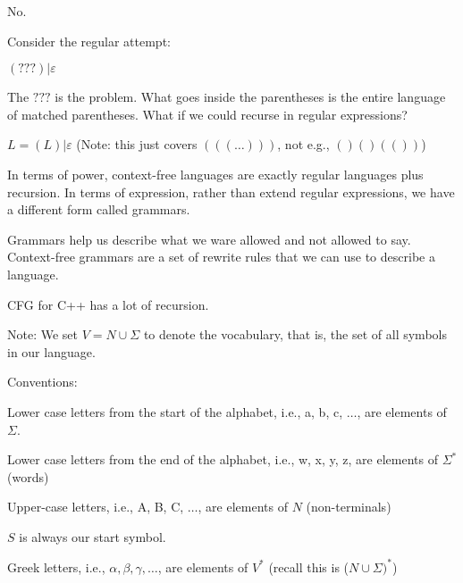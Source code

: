 \documentclass{article}
\begin{document}
No.

Consider the regular attempt:

\((???) | \varepsilon\)

The \(???\) is the problem. What goes inside the parentheses is the
entire language of matched parentheses. What if we could recurse in
regular expressions?

\(L = (L) | \varepsilon\) (Note: this just covers \((((\ldots)))\), not
e.g., \(()()(())\))

In terms of power, context-free languages are exactly regular languages
plus recursion. In terms of expression, rather than extend regular
expressions, we have a different form called grammars.


Grammars help us describe what we ware allowed and not allowed to say.
Context-free grammars are a set of rewrite rules that we can use to
describe a language.

CFG for C++ has a lot of recursion.


Note: We set \(V = N \cup \Sigma\) to denote the vocabulary, that is,
the set of all symbols in our language.

Conventions:

Lower case letters from the start of the alphabet, i.e., a, b, c,
\(\ldots\), are elements of \(\Sigma\).

Lower case letters from the end of the alphabet, i.e., w, x, y, z, are
elements of \(\Sigma^*\) (words)

Upper-case letters, i.e., A, B, C, \(\ldots\), are elements of \(N\)
(non-terminals)

\(S\) is always our start symbol.

Greek letters, i.e., \(\alpha, \beta, \gamma, \ldots\), are elements of
\(V^*\) (recall this is (\(N \cup \Sigma)^*\))
\end{document}
